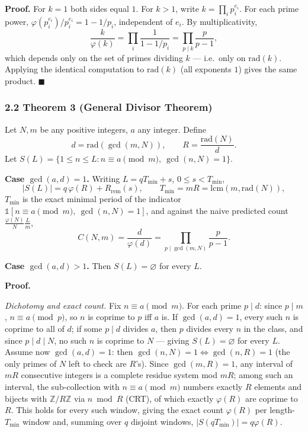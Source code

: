 \documentclass[
]{article}
\begin{document}
\textbf{Proof.} For \(k=1\) both sides equal \(1\). For \(k>1\), write
\(k=\prod_i p_i^{e_i}\). For each prime power,
\(\varphi(p_i^{e_i})/p_i^{e_i}=1-1/p_i\), independent of \(e_i\). By
multiplicativity, \[
\frac{k}{\varphi(k)} = \prod_i\frac{1}{1-1/p_i} = \prod_{p\mid k}\frac{p}{p-1},
\] which depends only on the set of primes dividing \(k\) --- i.e.~only
on \(\mathrm{rad}(k)\). Applying the identical computation to
\(\mathrm{rad}(k)\) (all exponents \(1\)) gives the same product.
\(\blacksquare\)

\subsubsection{2.2 Theorem 3 (General Divisor
Theorem)}\label{theorem-3-general-divisor-theorem}

Let \(N,m\) be any positive integers, \(a\) any integer. Define \[
d = \mathrm{rad}(\gcd(m,N)), \qquad R = \frac{\mathrm{rad}(N)}{d}.
\] Let \(S(L)=\{1\le n\le L : n\equiv a\pmod m,\ \gcd(n,N)=1\}\).

\textbf{Case \(\gcd(a,d)=1\).} Writing \(L=qT_{\min}+s\),
\(0\le s<T_{\min}\), \[
|S(L)| = q\,\varphi(R) + R_{\mathrm{rem}}(s), \qquad T_{\min} = mR = \mathrm{lcm}(m,\mathrm{rad}(N)),
\] \(T_{\min}\) is the exact minimal period of the indicator
\(\mathbb1[n\equiv a\pmod m,\ \gcd(n,N)=1]\), and against the naive
predicted count \(\frac{\varphi(N)}{N}\frac{L}{m}\), \[
C(N,m) = \frac{d}{\varphi(d)} = \prod_{p\mid\gcd(m,N)}\frac{p}{p-1}.
\]

\textbf{Case \(\gcd(a,d)>1\).} Then \(S(L)=\varnothing\) for every
\(L\).

\textbf{Proof.}

\emph{Dichotomy and exact count.} Fix \(n\equiv a\pmod m\). For each
prime \(p\mid d\): since \(p\mid m\), \(n\equiv a\pmod p\), so \(n\) is
coprime to \(p\) iff \(a\) is. If \(\gcd(a,d)=1\), every such \(n\) is
coprime to all of \(d\); if some \(p\mid d\) divides \(a\), then \(p\)
divides every \(n\) in the class, and since \(p\mid d\mid N\), no such
\(n\) is coprime to \(N\) --- giving \(S(L)=\varnothing\) for every
\(L\). Assume now \(\gcd(a,d)=1\): then \(\gcd(n,N)=1 \iff \gcd(n,R)=1\)
(the only primes of \(N\) left to check are \(R\)'s). Since
\(\gcd(m,R)=1\), any interval of \(mR\) consecutive integers is a
complete residue system mod \(mR\); among such an interval, the
sub-collection with \(n\equiv a\pmod m\) numbers exactly \(R\) elements
and bijects with \(\mathbb Z/R\mathbb Z\) via \(n\bmod R\) (CRT), of
which exactly \(\varphi(R)\) are coprime to \(R\). This holds for every
such window, giving the exact count \(\varphi(R)\) per
length-\(T_{\min}\) window and, summing over \(q\) disjoint windows,
\(|S(qT_{\min})|=q\varphi(R)\).
\end{document}
